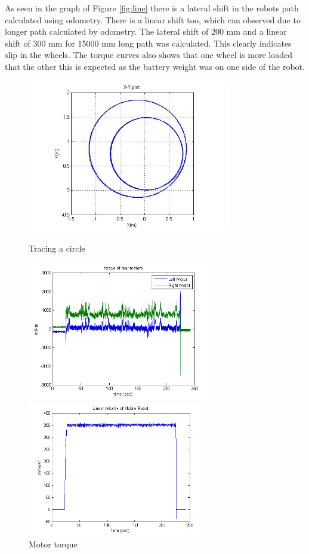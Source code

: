 As seen in the graph of Figure \ref{fig:line} there is a lateral shift in the robots path calculated using odometry.  There is a linear shift too, which can observed due to longer path calculated by odometry. The lateral shift of 200 mm and a linear shift of 300 mm for 15000 mm long path was calculated. This clearly indicates slip in the wheels. The torque curves also shows that one wheel is more loaded that the other this is expected as the battery weight was on one side of the robot.
\begin{figure}
	\begin{minipage}[t]{0.5\textwidth}
		\centering
		\includegraphics[width=3.5in]{Chapter5/fig/circleOdo} 
		\caption{Tracing a circle}\label{fig:circle}
	\end{minipage}
	\hfill
	\begin{minipage}[t]{0.5\textwidth}
		\centering
		\includegraphics[width=3.2in]{Chapter5/fig/cirTorq} 
		\caption{Motor torque}\label{fig:cirTorq}
	\end{minipage}
\vfill 
\begin{minipage}[t]{0.5\textwidth}
	\centering
	\includegraphics[width=3.1in]{Chapter5/fig/cirVel} 

\end{minipage}
\end{figure}
